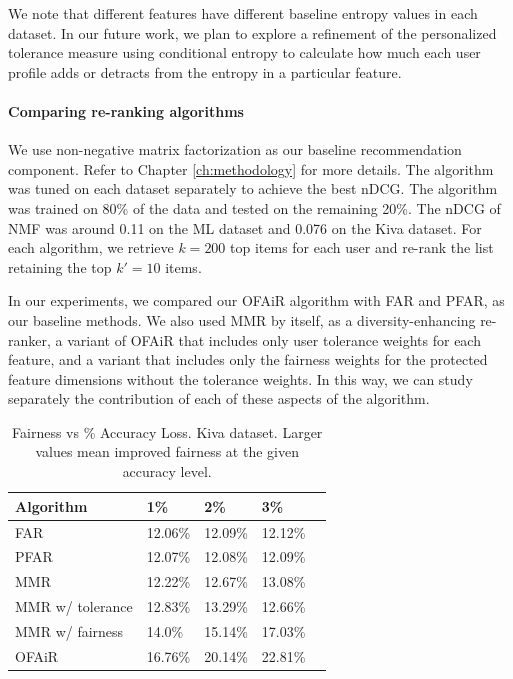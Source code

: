 We note that different features have different baseline entropy values in each dataset. In our future work, we plan to explore a refinement of the personalized tolerance measure using conditional entropy to calculate how much each user profile adds or detracts from the entropy in a particular feature.


\noindent\paragraph{\textbf{Comparing re-ranking algorithms}}
\newline
\indent We use non-negative matrix factorization as our baseline recommendation component. Refer to Chapter \ref{ch:methodology} for more details. The algorithm was tuned on each dataset separately to achieve the best nDCG. The algorithm was trained on 80\% of the data and tested on the remaining 20\%. The nDCG of NMF was around 0.11 on the ML dataset and 0.076 on the Kiva dataset.
For each algorithm, we retrieve $k=200$ top items for each user and re-rank the list retaining the top $k'=10$ items.  

In our experiments, we compared our OFAiR algorithm with FAR and PFAR, as our baseline methods. We also used MMR by itself, as a diversity-enhancing re-ranker, a variant of OFAiR that includes only user tolerance weights for each feature, and a variant that includes only the fairness weights for the protected feature dimensions without the tolerance weights. In this way, we can study separately the contribution of each of these aspects of the algorithm.

\begin{table}[]
\centering
\begin{tabular}{lllll}
 Algorithm &  1\% & 2\% & 3\% \\
 \hline
 FAR & 12.06\% & 12.09\% & 12.12\% \\
 PFAR & 12.07\% & 12.08\% & 12.09\% \\
 MMR &  12.22\% & 12.67\% & 13.08\% \\
 MMR w/ tolerance & 12.83\% & 13.29\% & 12.66\%   \\
 MMR w/ fairness & 14.0\% & 15.14\% & 17.03\%  \\
 OFAiR & 16.76\% & 20.14\% & 22.81\% \\
 \hline
\end{tabular}
\caption{Fairness vs \% Accuracy Loss. Kiva dataset. 
Larger values mean improved fairness at the given accuracy level.}
\label{tbl:kiva_fairness_accuracy_relationship}
\end{table}

